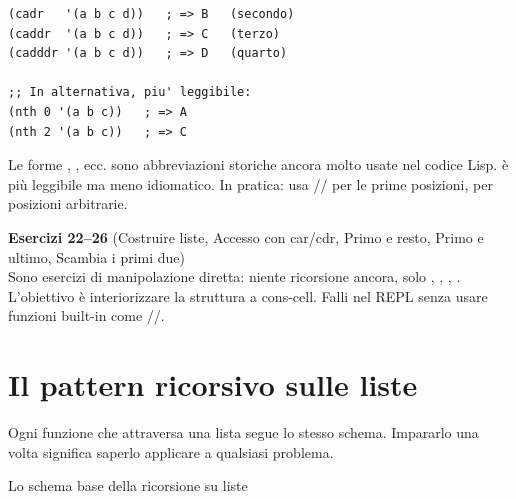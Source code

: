 \begin{esempio}
\begin{lstlisting}
(cadr   '(a b c d))   ; => B   (secondo)
(caddr  '(a b c d))   ; => C   (terzo)
(cadddr '(a b c d))   ; => D   (quarto)

;; In alternativa, piu' leggibile:
(nth 0 '(a b c))   ; => A
(nth 2 '(a b c))   ; => C
\end{lstlisting}
\end{esempio}

\begin{nota}
Le forme , , ecc. sono abbreviazioni storiche ancora
molto usate nel codice Lisp.  è più leggibile ma meno
idiomatico. In pratica: usa // per le
prime posizioni,  per posizioni arbitrarie.
\end{nota}

\begin{workbook}
\textbf{Esercizi 22--26}
(Costruire liste, Accesso con car/cdr, Primo e resto,
Primo e ultimo, Scambia i primi due)\\[4pt]
Sono esercizi di manipolazione diretta: niente ricorsione ancora,
solo , , , .
L'obiettivo è interiorizzare la struttura a cons-cell.
Falli nel REPL senza usare funzioni built-in come //.
\end{workbook}

\section{Il pattern ricorsivo sulle liste}

\begin{intuizione}
Ogni funzione che attraversa una lista segue lo stesso schema.
Impararlo una volta significa saperlo applicare a qualsiasi problema.
\end{intuizione}

\begin{concetto}{Lo schema base della ricorsione su liste}

\boxsep
{}

\boxsep
{}
\end{concetto}

